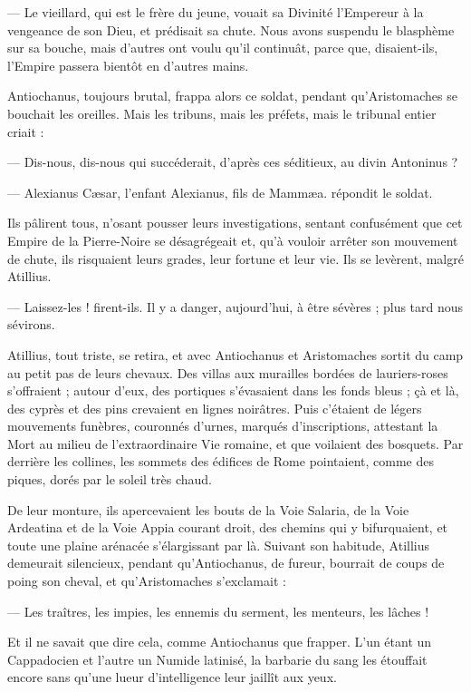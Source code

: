 \documentclass[a4paper, 11pt, oneside, polutonikogreek, french]{article}
\begin{document}
--- Le vieillard, qui est le frère du jeune, vouait sa Divinité l'Empereur à la vengeance de son Dieu, et prédisait sa chute. Nous avons suspendu le blasphème sur sa bouche, mais d'autres ont voulu qu'il continuât, parce que, disaient-ils, l'Empire passera bientôt en d'autres mains.

Antiochanus, toujours brutal, frappa alors ce soldat, pendant qu'Aristomaches se bouchait les oreilles. Mais les tribuns, mais les préfets, mais le tribunal entier criait :

--- Dis-nous, dis-nous qui succéderait, d'après ces séditieux, au divin Antoninus ?

--- Alexianus Cæsar, l'enfant Alexianus, fils de Mammæa. répondit le soldat.

Ils pâlirent tous, n'osant pousser leurs investigations, sentant confusément que cet Empire de la Pierre-Noire se désagrégeait et, qu'à vouloir arrêter son mouvement de chute, ils risquaient leurs grades, leur fortune et leur vie. Ils se levèrent, malgré Atillius.

--- Laissez-les ! firent-ils. Il y a danger, aujourd'hui, à être sévères ; plus tard nous sévirons.

Atillius, tout triste, se retira, et avec Antiochanus et Aristomaches sortit du camp au petit pas de leurs chevaux.
Des villas aux murailles bordées de lauriers-roses s'offraient ; autour d'eux, des portiques s'évasaient dans les fonds bleus ; çà et là, des cyprès et des pins crevaient en lignes noirâtres. Puis c'étaient de légers mouvements funèbres, couronnés d'urnes, marqués d'inscriptions, attestant la Mort au milieu de l'extraordinaire Vie romaine, et que voilaient des bosquets. Par derrière les collines, les sommets des édifices de Rome pointaient, comme des piques, dorés par le soleil très chaud.

De leur monture, ils apercevaient les bouts de la Voie Salaria, de la Voie Ardeatina et de la Voie Appia courant droit, des chemins qui y bifurquaient, et toute une plaine arénacée s'élargissant par là. Suivant son habitude, Atillius demeurait silencieux, pendant qu'Antiochanus, de fureur, bourrait de coups de poing son cheval, et qu’Aristomaches s'exclamait :

--- Les traîtres, les impies, les ennemis du serment, les menteurs, les lâches !

Et il ne savait que dire cela, comme Antiochanus que frapper. L'un étant un Cappadocien et l'autre un Numide latinisé, la barbarie du sang les étouffait encore sans qu'une lueur d'intelligence leur jaillît aux yeux.
\end{document}
